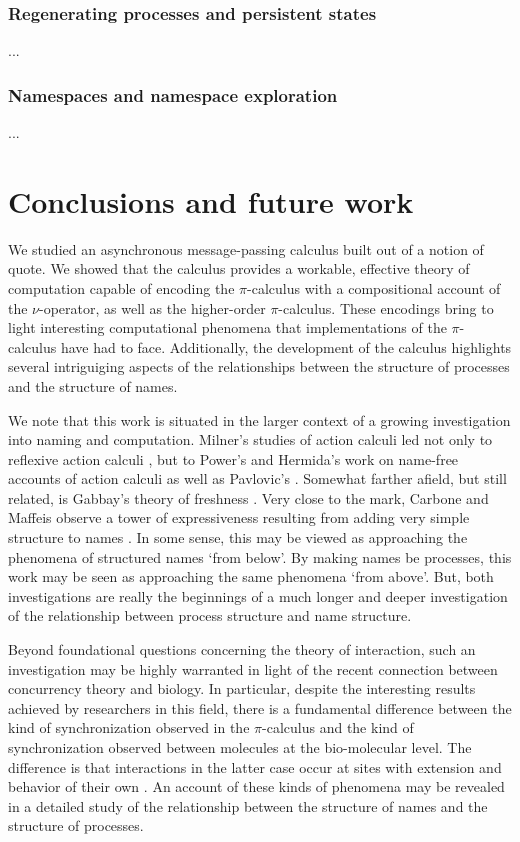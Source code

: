 \documentclass[]{entcs}
\newcommand{\pic}{$\pi$-calculus}
\begin{document}
\subsubsection{Regenerating processes and persistent states}

...

\subsubsection{Namespaces and namespace exploration}

...

\section{Conclusions and future work}

We studied an asynchronous message-passing calculus built out of a
notion of quote. We showed that the calculus provides a workable,
effective theory of computation capable of encoding the {\pic} with a
compositional account of the $\nu$-operator, as well as the
higher-order {\pic}. These encodings bring to light interesting
computational phenomena that implementations of the {\pic} have had to
face. Additionally, the development of the calculus highlights several
intriguiging aspects of the relationships between the structure of
processes and the structure of names.

We note that this work is situated in the larger context of a growing
investigation into naming and computation. Milner's studies of action
calculi led not only to reflexive action calculi
\cite{DBLP:conf/tacs/Milner97}, but to Power's and Hermida's work on
name-free accounts of action calculi
\cite{DBLP:conf/concur/HermidaP95} as well as Pavlovic's \cite{PavlovicD:CLNA}. 
Somewhat farther afield, but still
related, is Gabbay's theory of freshness \cite{GabbayMJ:picfm}. Very
close to the mark, Carbone and Maffeis observe a tower of
expressiveness resulting from adding very simple structure to names
\cite{polysync}. In some sense, this may be viewed as approaching the
phenomena of structured names `from below'. By making names be
processes, this work may be seen as approaching the same phenomena
`from above'. But, both investigations are really the beginnings of a
much longer and deeper investigation of the relationship between
process structure and name structure.

Beyond foundational questions concerning the theory of interaction,
such an investigation may be highly warranted in light of the recent
connection between concurrency theory and biology. In particular,
despite the interesting results achieved by researchers in this field,
there is a fundamental difference between the kind of synchronization
observed in the {\pic} and the kind of synchronization observed
between molecules at the bio-molecular level. The difference is that
interactions in the latter case occur at sites with extension and
behavior of their own \cite{Fontana}. An account of these kinds of
phenomena may be revealed in a detailed study of the relationship
between the structure of names and the structure of processes.
\end{document}
